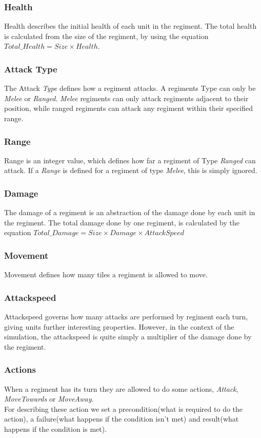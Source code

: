 		\subsubsection{Health}
		Health describes the initial health of each unit in the regiment.
		The total health is calculated from the size of the regiment, by using the equation $Total\_Health = Size \times Health$.
		
		\subsubsection{Attack Type}
		The Attack \textit{Type} defines how a regiment attacks. A regiments Type can only be \textit{Melee} or \textit{Ranged}.
		\textit{Melee} regiments can only attack regiments adjacent to their position, while ranged regiments 
		can attack any regiment within their specified range.
		
		\subsubsection{Range}
		Range is an integer value, which defines how far a regiment of Type \textit{Ranged} can attack. 
		If a \textit{Range} is defined for a regiment of type \textit{Melee}, this is simply ignored.
		
		\subsubsection{Damage}
		The damage of a regiment is an abstraction of the damage done by each unit in the regiment.
		The total damage done by one regiment, is calculated by the equation $Total\_Damage = Size \times Damage \times AttackSpeed$ 
		
		\subsubsection{Movement}
		Movement defines how many tiles a regiment is allowed to move.
		
		\subsubsection{Attackspeed}
		Attackspeed governs how many attacks are performed by regiment each turn, giving units further interesting properties. 
		However, in the context of the simulation, the attackspeed is quite simply a multiplier of the damage done by the regiment.
		
		\subsubsection{Actions}
		When a regiment has its turn they are allowed to do some actions, \textit{Attack}, \textit{MoveTowards} or \textit{MoveAway}. \\
		For describing these action we set a precondition(what is required to do the action), a failure(what happens if the condition isn't met)
		and result(what happens if the condition is met).
		
